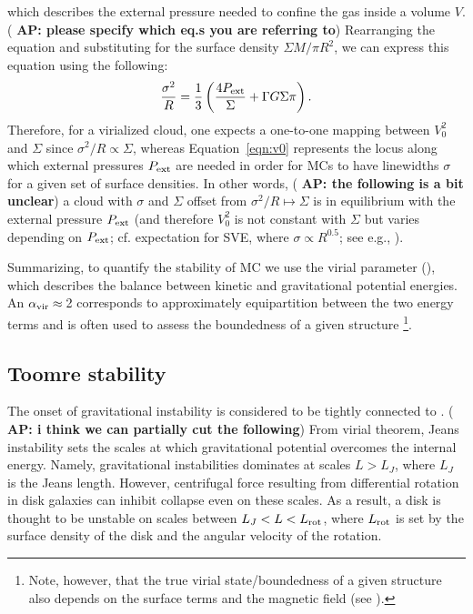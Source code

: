 \IfFileExists{emulateapjlegacy.cls}{\documentclass[iop]{emulateapjlegacy}}{\documentclass[iop]{emulateapj}}
\newcommand{\AP}[1]{({\bf \color{apcolor} AP: #1})}
\begin{document}
which describes the external pressure needed to confine the gas inside a volume $V$. \AP{please specify which eq.s you are referring to} Rearranging the equation and substituting for the surface density $\Sigma$\eq$M/\pi R^2$, we can express this equation using the following:
\begin{equation}
\frac{\sigma^2}{R} = \frac{1}{3}\left(\frac{4P_{\rm ext}}{\Sigma} + \Gamma G \Sigma \pi \right).
\label{eqn:v0}
\end{equation}
Therefore, for a virialized cloud, one expects a one-to-one mapping between $V_0^2$ and $\Sigma$ since $\sigma^2/R\propto\Sigma$, whereas Equation~\ref{eqn:v0} represents the locus along which external pressures $P_{\rm ext}$ are needed in order for MCs to have linewidths $\sigma$ for a given set of surface densities. %
In other words, \AP{the following is a bit unclear} a cloud with $\sigma$ and $\Sigma$ offset from $\sigma^2/R\mapsto\Sigma$ is in equilibrium with the external pressure $P_{\rm ext}$ (and therefore $V_0^2$ is not constant with $\Sigma$ but varies depending on $P_{\rm ext}$; cf. expectation for SVE, where $\sigma\propto R^{0.5}$; see e.g., \citealt{Heyer09a, Hughes10a, Hughes13b, Meidt13a}).

Summarizing, to quantify the stability of MC we use the virial parameter (), which describes the balance between kinetic and gravitational potential energies. An $\alpha_{\rm vir}\approx$\,2 corresponds to approximately equipartition between the two energy terms and is often used to assess the boundedness of a given structure \citep[see e.g., ][]{Kauffmann17b}\footnote{Note, however, that the true virial state/boundedness of a given structure also depends on the surface terms and the magnetic field (see ).}.

\subsection{Toomre stability}\label{sec:Q}

The onset of gravitational instability is considered to be tightly connected to \SF \citep[e.g.,][]{Kennicutt89a, Wang94a, Li05b, Li06a}. \AP{i think we can partially cut the following} From virial theorem, Jeans instability sets the scales at which gravitational potential overcomes the internal energy. Namely, gravitational instabilities dominates at scales $L > L_J$, where $L_J$ is the Jeans length. However, centrifugal force resulting from differential rotation in disk galaxies can inhibit collapse even on these scales. As a result, a disk is thought to be unstable on scales between $L_J < L < L_{\rm rot}$, where $L_{\rm rot}$ is set by the surface density of the disk and the angular velocity of the rotation. 
\end{document}
